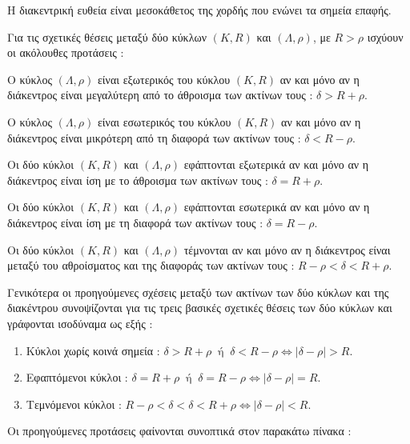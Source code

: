 \documentclass[twoside,nofonts,ektypwsh,shmeiwseis]{thewria}
\begin{document}
\vspace{-3mm}
\begin{rlist}[start=3]
\item Η διακεντρική ευθεία είναι μεσοκάθετος της χορδής που ενώνει τα σημεία επαφής.
\end{rlist}
Για τις σχετικές θέσεις μεταξύ δύο κύκλων $ \left( K,R\right) $ και $ (\varLambda,\rho) $, με $ R>\rho $ ισχύουν οι ακόλουθες προτάσεις :
\begin{rlist}
\item Ο κύκλος $ (\varLambda,\rho) $ είναι εξωτερικός του κύκλου $ \left( K,R\right) $ αν και μόνο αν η διάκεντρος είναι μεγαλύτερη από το άθροισμα των ακτίνων τους : $ \delta>R+\rho $.
\item Ο κύκλος $ (\varLambda,\rho) $ είναι εσωτερικός του κύκλου $ \left( K,R\right) $ αν και μόνο αν η διάκεντρος είναι μικρότερη από τη διαφορά των ακτίνων τους : $ \delta<R-\rho $.
\item Οι δύο κύκλοι $ \left( K,R\right) $ και $ (\varLambda,\rho) $ εφάπτονται εξωτερικά αν και μόνο αν η διάκεντρος είναι ίση με το άθροισμα των ακτίνων τους :
$ \delta=R+\rho $.
\item Οι δύο κύκλοι $ \left( K,R\right) $ και $ (\varLambda,\rho) $ εφάπτονται εσωτερικά αν και μόνο αν η διάκεντρος είναι ίση με τη διαφορά των ακτίνων τους :
$ \delta=R-\rho $.
\item Οι δύο κύκλοι $ \left( K,R\right) $ και $ (\varLambda,\rho) $ τέμνονται αν και μόνο αν η διάκεντρος είναι μεταξύ του αθροίσματος και της διαφοράς των ακτίνων τους : $ R-\rho<\delta<R+\rho $.
\end{rlist}
Γενικότερα οι προηγούμενες σχέσεις μεταξύ των ακτίνων των δύο κύκλων και της διακέντρου συνοψίζονται για τις τρεις βασικές σχετικές θέσεις των δύο κύκλων και γράφονται ισοδύναμα ως εξής :
\begin{enumerate}[itemsep=0mm,label=\bf\arabic*.]
\item Κύκλοι χωρίς κοινά σημεία : $ \delta>R+\rho\ \textrm{ ή }\ \delta<R-\rho\Leftrightarrow |\delta-\rho|>R $.
\item Εφαπτόμενοι κύκλοι : $ \delta=R+\rho\ \textrm{ ή }\ \delta=R-\rho\Leftrightarrow |\delta-\rho|=R $.
\item Τεμνόμενοι κύκλοι : $ R-\rho<\delta<\delta<R+\rho\Leftrightarrow |\delta-\rho|<R $.
\end{enumerate}
Οι προηγούμενες προτάσεις φαίνονται συνοπτικά στον παρακάτω πίνακα :
\end{document}
